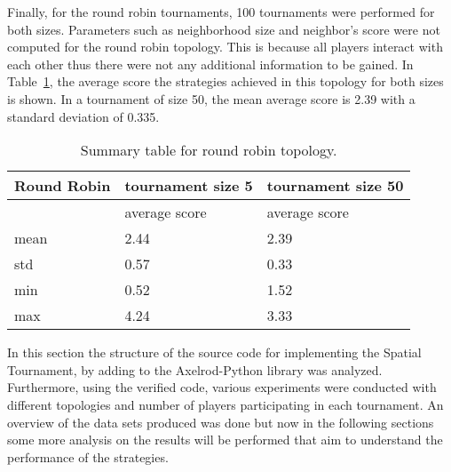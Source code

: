 Finally, for the round robin tournaments, 100 tournaments were performed for both
sizes. Parameters such as neighborhood size and neighbor's score
were not computed for the round robin topology. This is because all players
interact with each other thus there were not any additional information to be
gained. In Table~\ref{sum-rr}, the average score the strategies achieved
in this topology for both sizes is shown. In a tournament of size 50, the mean average
score is 2.39 with a standard deviation of 0.335.

\begin{table}[H]
	\centering
	\begin{adjustbox}{width=0.5\textwidth}
		\small
	\begin{tabular}{|l|l|l|}
		\hline
		Round Robin & \multicolumn{1}{c|}{tournament size 5} & \multicolumn{1}{c|}{tournament size 50} \\ \hline

		            & average score                          & average score                           \\ \hline
		mean        & 2.44                                   & 2.39                                    \\ \hline
		std         & 0.57                                   & 0.33                                    \\ \hline
		min         & 0.52                                   & 1.52                                    \\ \hline
		max         & 4.24                                   & 3.33                                    \\ \hline
	\end{tabular}
\end{adjustbox}
	\caption{Summary table for round robin topology.}
	\label{sum-rr}
\end{table}

In this section the structure of the source code for implementing the Spatial
Tournament, by adding to the Axelrod-Python library was analyzed. Furthermore,
using the verified code, various experiments were conducted with different
topologies
and number of players participating in each tournament. An overview of the
data sets produced was done but now in the following sections
some more analysis on the results will be performed that aim to understand
the performance of the strategies.

